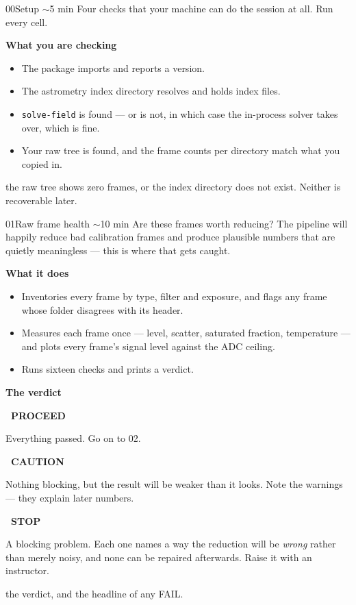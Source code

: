 \documentclass[11pt,a4paper]{article}
\newcommand{\cm}[1]{\texttt{\small #1}}
\newcommand{\verdict}[3]{%
  \noindent\colorbox{#1!14}{\textcolor{#1}{\sffamily\bfseries\scriptsize\ #2\ }}%
  \hspace{6pt}\begin{minipage}[t]{0.80\textwidth}\small #3\end{minipage}\par\vspace{5pt}}
\newcommand{\recordline}[2]{%
  \vspace{6pt}{\color{rule}\hrule}\vspace{6pt}%
  \noindent{\sffamily\bfseries\scriptsize\color{accent}\MakeUppercase{#1}}\hspace{6pt}%
  \begin{minipage}[t]{0.78\textwidth}\small #2\end{minipage}}
\begin{document}
\begin{nbbox}{00}{Setup \quad\textnormal{\sffamily\scriptsize\color{inkfaint}$\sim$5 min}}
\small\color{inksoft} Four checks that your machine can do the session at all. Run every cell.
\par\vspace{6pt}\color{ink}
{\sffamily\bfseries\small What you are checking}
\begin{itemize}
\item The package imports and reports a version.
\item The astrometry index directory resolves and holds index files.
\item \cm{solve-field} is found --- or is not, in which case the in-process solver takes over,
which is fine.
\item Your raw tree is found, and the frame counts per directory match what you copied in.
\end{itemize}
\recordline{Stop if}{the raw tree shows zero frames, or the index directory does not exist.
Neither is recoverable later.}
\end{nbbox}

\begin{nbbox}{01}{Raw frame health \quad\textnormal{\sffamily\scriptsize\color{inkfaint}$\sim$10 min}}
\small\color{inksoft} Are these frames worth reducing? The pipeline will happily reduce bad
calibration frames and produce plausible numbers that are quietly meaningless --- this is where
that gets caught.
\par\vspace{6pt}\color{ink}
{\sffamily\bfseries\small What it does}
\begin{itemize}
\item Inventories every frame by type, filter and exposure, and flags any frame whose folder
disagrees with its header.
\item Measures each frame once --- level, scatter, saturated fraction, temperature --- and plots
every frame's signal level against the ADC ceiling.
\item Runs sixteen checks and prints a verdict.
\end{itemize}
\vspace{6pt}
{\sffamily\bfseries\small The verdict}\par\vspace{5pt}
\verdict{pass}{PROCEED}{Everything passed. Go on to 02.}
\verdict{warn}{CAUTION}{Nothing blocking, but the result will be weaker than it looks. Note the
warnings --- they explain later numbers.}
\verdict{fail}{STOP}{A blocking problem. Each one names a way the reduction will be
\emph{wrong} rather than merely noisy, and none can be repaired afterwards. Raise it with an
instructor.}
\recordline{Record}{the verdict, and the headline of any FAIL.}
\end{nbbox}
\end{document}
